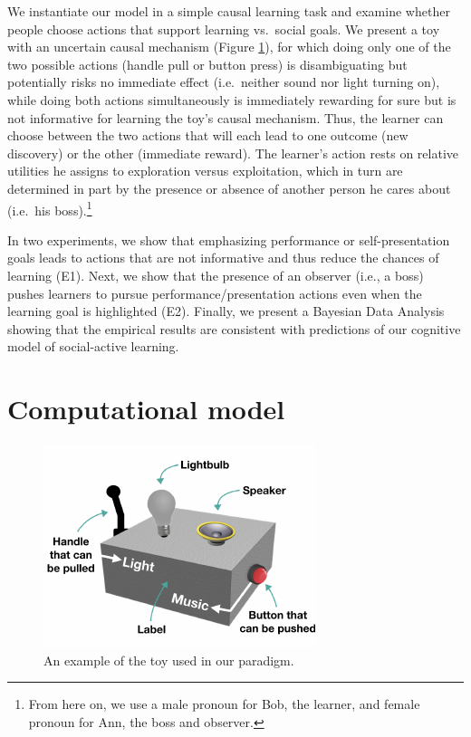 \documentclass[10pt, letterpaper]{article}
\newenvironment{CodeChunk}{}{}
\begin{document}
We instantiate our model in a simple causal learning task and examine
whether people choose actions that support learning vs.~social goals. We
present a toy with an uncertain causal mechanism (Figure \ref{fig:toy}),
for which doing only one of the two possible actions (handle pull or
button press) is disambiguating but potentially risks no immediate
effect (i.e.~neither sound nor light turning on), while doing both
actions simultaneously is immediately rewarding for sure but is not
informative for learning the toy's causal mechanism. Thus, the learner
can choose between the two actions that will each lead to one outcome
(new discovery) or the other (immediate reward). The learner's action
rests on relative utilities he assigns to exploration versus
exploitation, which in turn are determined in part by the presence or
absence of another person he cares about (i.e.~his
boss).\footnote{From here on, we use a male pronoun for Bob, the learner, and female pronoun for Ann, the boss and observer.}

In two experiments, we show that emphasizing performance or
self-presentation goals leads to actions that are not informative and
thus reduce the chances of learning (E1). Next, we show that the
presence of an observer (i.e., a boss) pushes learners to pursue
performance/presentation actions even when the learning goal is
highlighted (E2). Finally, we present a Bayesian Data Analysis showing
that the empirical results are consistent with predictions of our
cognitive model of social-active learning.

\section{Computational model}\label{computational-model}

\begin{CodeChunk}
\begin{figure}[t]

{\centering \includegraphics[width=0.65\linewidth]{figs/toy-1} 

}

\caption[An example of the toy used in our paradigm]{An example of the toy used in our paradigm.}\label{fig:toy}
\end{figure}
\end{CodeChunk}
\end{document}
